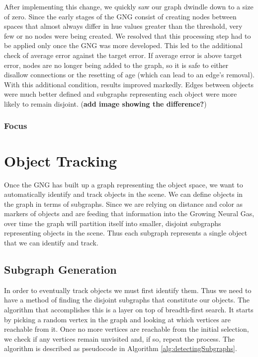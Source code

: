 \documentclass{article}
\renewcommand{\|}{\origbar} %
\begin{document}
After implementing this change, we quickly saw our graph dwindle down to a size of zero. Since the early stages of the GNG consist of creating nodes between spaces that almost always differ in hue values greater than the threshold, very few or no nodes were being created. We resolved that this processing step had to be applied only once the GNG was more developed. This led to the additional check of average error against the target error. If average error is above target error, nodes are no longer being added to the graph, so it is safe to either disallow connections or the resetting of age (which can lead to an edge's removal). With this additional condition, results improved markedly. Edges between objects were much better defined and subgraphs representing each object were more likely to remain disjoint. ({\bf add image showing the difference?})

\subsubsection{Focus}

\section{Object Tracking}
\label{sec:objectTracking}

Once the GNG has built up a graph representing the object space, we want to automatically identify and track objects in the scene. We can define objects in the graph in terms of subgraphs. Since we are relying on distance and color as markers of objects and are feeding that information into the Growing Neural Gas, over time the graph will partition itself into smaller, disjoint subgraphs representing objects in the scene. Thus each subgraph represents a single object that we can identify and track.

\subsection{Subgraph Generation}

In order to eventually track objects we must first identify them. Thus we need to have a method of finding the disjoint subgraphs that constitute our objects. The algorithm that accomplishes this is a layer on top of breadth-first search. It starts by picking a random vertex in the graph and looking at which vertices are reachable from it. Once no more vertices are reachable from the initial selection, we check if any vertices remain unvisited and, if so, repeat the process. The algorithm is described as pseudocode in Algorithm \ref{alg:detectingSubgraphs}.
\end{document}
